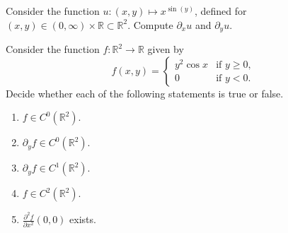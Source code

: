 
\begin{exercise}
\label{ex:derivative_computation_exponential}
Consider the function $u : (x,y) \mapsto x^{\sin(y)}$, defined for
$(x,y) \in (0,\infty)\times\mathbb{R} \subset \mathbb{R}^2$. Compute $\partial_x u$ and
$\partial_y u$.
\end{exercise}

\begin{exercise}
\label{ex:examHS24_TF_diff_piecewise}
Consider the function $f \colon \mathbb{R}^2 \to \mathbb{R}$ given by
\[
f(x,y) = \begin{cases}
y^2 \cos x & \text{if } y \ge 0, \\
0 & \text{if } y < 0.
\end{cases}
\]
Decide whether each of the following statements is true or false.
\begin{enumerate}[label=\textbf{(\alph*)}]
  \item $f \in C^0(\mathbb{R}^2)$.
  \item $\partial_y f \in C^0(\mathbb{R}^2)$.
  \item $\partial_y f \in C^1(\mathbb{R}^2)$.
  \item $f \in C^2(\mathbb{R}^2)$.
  \item $\frac{\partial^2 f}{\partial x^2}(0,0)$ exists.
\end{enumerate}
\end{exercise}

